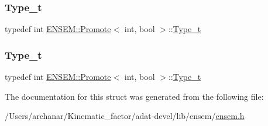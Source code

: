 \subsubsection{\texorpdfstring{Type\_t}{Type\_t}\hspace{0.1cm}{\footnotesize\ttfamily [2/3]}}
{\footnotesize\ttfamily typedef int \mbox{\hyperlink{structENSEM_1_1Promote}{E\+N\+S\+E\+M\+::\+Promote}}$<$ int, bool $>$\+::\mbox{\hyperlink{structENSEM_1_1Promote_3_01int_00_01bool_01_4_a41a8125f71f49258876367a95577157c}{Type\+\_\+t}}}

\mbox{\label{structENSEM_1_1Promote_3_01int_00_01bool_01_4_a41a8125f71f49258876367a95577157c}} 
\subsubsection{\texorpdfstring{Type\_t}{Type\_t}\hspace{0.1cm}{\footnotesize\ttfamily [3/3]}}
{\footnotesize\ttfamily typedef int \mbox{\hyperlink{structENSEM_1_1Promote}{E\+N\+S\+E\+M\+::\+Promote}}$<$ int, bool $>$\+::\mbox{\hyperlink{structENSEM_1_1Promote_3_01int_00_01bool_01_4_a41a8125f71f49258876367a95577157c}{Type\+\_\+t}}}



The documentation for this struct was generated from the following file\+:\begin{DoxyCompactItemize}
\item 
/\+Users/archanar/\+Kinematic\+\_\+factor/adat-\/devel/lib/ensem/\mbox{\hyperlink{adat-devel_2lib_2ensem_2ensem_8h}{ensem.\+h}}\end{DoxyCompactItemize}
